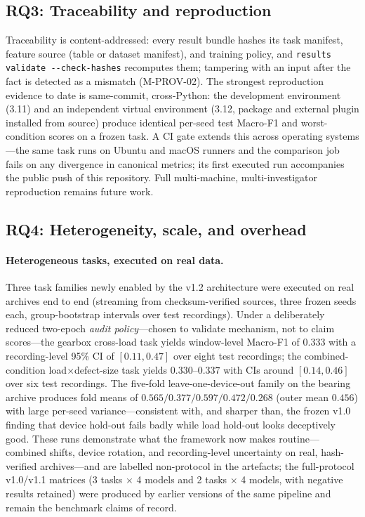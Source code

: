 \subsection{RQ3: Traceability and reproduction}

Traceability is content-addressed: every result bundle hashes its task
manifest, feature source (table or dataset manifest), and training policy,
and \texttt{results validate -{}-check-hashes} recomputes them; tampering
with an input after the fact is detected as a mismatch (M-PROV-02). The
strongest reproduction evidence to date is same-commit, cross-Python: the
development environment (3.11) and an independent virtual environment (3.12,
package and external plugin installed from source) produce identical
per-seed test Macro-F1 and worst-condition scores on a frozen task. A CI
gate extends this across operating systems---the same task runs on Ubuntu
and macOS runners and the comparison job fails on any divergence in
canonical metrics; its first executed run accompanies the public push of
this repository. Full multi-machine, multi-investigator reproduction
remains future work.

\subsection{RQ4: Heterogeneity, scale, and overhead}

\paragraph{Heterogeneous tasks, executed on real data.}
Three task families newly enabled by the v1.2 architecture were executed on
real archives end to end (streaming from checksum-verified sources, three
frozen seeds each, group-bootstrap intervals over test recordings). Under a
deliberately reduced two-epoch \emph{audit policy}---chosen to validate
mechanism, not to claim scores---the gearbox cross-load task yields
window-level Macro-F1 of $0.333$ with a recording-level 95\% CI of
$[0.11, 0.47]$ over eight test recordings; the combined-condition
load$\times$defect-size task yields $0.330$--$0.337$ with CIs around
$[0.14, 0.46]$ over six test recordings. The five-fold leave-one-device-out
family on the bearing archive produces fold means of
$0.565/0.377/0.597/0.472/0.268$ (outer mean $0.456$) with large per-seed
variance---consistent with, and sharper than, the frozen v1.0 finding that
device hold-out fails badly while load hold-out looks deceptively good.
These runs demonstrate what the framework now makes routine---combined
shifts, device rotation, and recording-level uncertainty on real,
hash-verified archives---and are labelled non-protocol in the artefacts; the
full-protocol v1.0/v1.1 matrices (3 tasks $\times$ 4 models and 2 tasks
$\times$ 4 models, with negative results retained) were produced by earlier
versions of the same pipeline and remain the benchmark claims of record.

